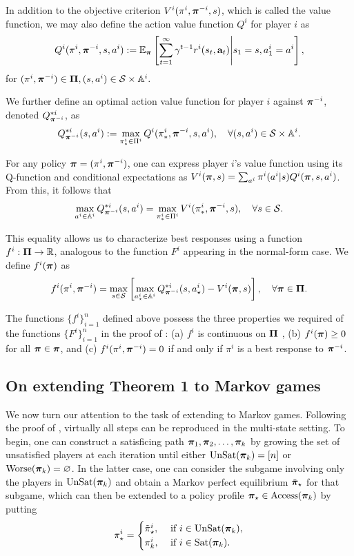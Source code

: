 In addition to the objective criterion $V^i ( \pi^i, \bm{\pi}^{-i}, s )$, which is called the value function, we may also define the action value function $Q^i$ for player $i$ as
\[
Q^i ( \pi^i, \bm{\pi}^{-i} , s, a^i ) := \mathbb{E}_{\bm{\pi}} \left[ \sum_{t=1}^{\infty} \gamma^{t-1} r^i( s_t, {\mathbf{a}}_t ) \middle| s_1 = s, a^i_1 = a^i  \right], 
\]
for $(\pi^i, \bm{\pi}^{-i} ) \in \bm{\Pi}, (s,a^i) \in \mathcal{S} \times \mathbb{A}^i . $ 

We further define an optimal action value function for player $i$ against $\bm{\pi}^{-i}$, denoted $Q^{*i}_{\bm{\pi}^{-i}}$, as 
\[
Q^{*i}_{\bm{\pi}^{-i}} ( s, a^i ) := \max_{ \pi^i_{*} \in \Pi^i } Q^i ( \pi^i_{*}, \bm{\pi}^{-i} , s , a^i ) , \quad \forall (s,a^i ) \in \mathcal{S} \times \mathbb{A}^i . 
\]

For any policy $\bm{\pi} = (\pi^i, \bm{\pi}^{-i})$, one can express player $i$'s value function using its Q-function and conditional expectations as $V^i ( \bm{\pi}, s ) = \sum_{a^i} \pi^i(a^i|s) Q^i ( \bm{\pi}, s,a^i )$. From this, it follows that 
\[
\max_{a^i \in \mathbb{A}^i } Q^{*i}_{\bm{\pi}^{-i}} ( s, a^i ) = \max_{\pi^i_{*} \in \Pi^i } V^i ( \pi^i_{*} , \bm{\pi}^{-i}, s ) , \quad \forall s \in \mathcal{S}.  
\]

This equality allows us to characterize best responses using a function $f^i : \bm{\Pi} \to \mathbb{R}$, analogous to the function $F^i$ appearing in the normal-form case. We define $f^i ( \bm{\pi} ) $ as 
\[
f^i ( \pi^i, \bm{\pi}^{-i} ) = \max_{ s \in \mathcal{S} } \left[  \max_{ a^i_{\star} \in \mathbb{A}^i } Q^{*i}_{\bm{\pi}^{-i}} ( s, a^i_{\star}) - V^i ( \bm{\pi}, s )          \right], \quad \forall \bm{\pi} \in \bm{\Pi}. 
\]

The functions $\{ f^i \}_{i=1}^n$ defined above possess the three properties we required of the functions $\{ F^i \}_{i = 1}^n$ in the proof of : (a) $f^i$ is continuous on $\bm{\Pi}$ \cite{yongacoglu2023satisficing}, (b) $f^i ( \bm{\pi} ) \geq 0$ for all $\bm{\pi} \in \bm{\pi}$, and (c) $f^i ( \pi^i, \bm{\pi}^{-i} ) = 0 $ if and only if $\pi^i$ is a best response to $\bm{\pi}^{-i}$. 

\subsection*{On extending Theorem 1 to Markov games}

We now turn our attention to the task of extending  to Markov games. Following the proof of , virtually all steps can be reproduced in the multi-state setting. To begin, one can construct a satisficing path $\bm{\pi}_1, \bm{\pi}_2, \dots, \bm{\pi}_k$ by growing the set of unsatisfied players at each iteration until either ${\rm UnSat}(\bm{\pi}_k) = [n]$ or ${\rm Worse}( \bm{\pi}_k ) = \varnothing$. In the latter case, one can consider the subgame involving only the players in ${\rm UnSat}(\bm{\pi}_k)$ and obtain a Markov perfect equilibrium $\tilde{\bm{\pi}}_{\star}$ for that subgame, which can then be extended to a policy profile $\bm{\pi}_{\star} \in {\rm Access}( \bm{\pi}_k )$ by putting 
\[
\pi^i_{\star}=  
                \begin{cases}
                \tilde{\pi}^i_{\star}, &\text{ if } i \in {\rm UnSat}(\bm{\pi}_k), \\
                \pi^i_k, &\text{ if } i \in {\rm Sat}(\bm{\pi}_k). 
                \end{cases}
\]

